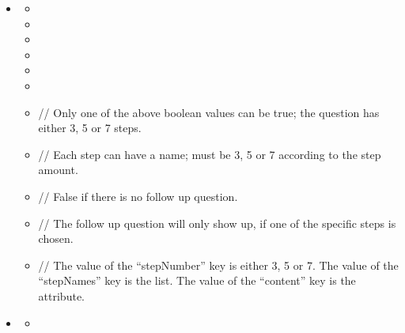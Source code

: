 \documentclass[a4paper]{scrreprt}
\begin{document}
{\begin{itemize}
                    \item {}
                        \begin{itemize}
                            \item {}
                            \item {}
                            \item {}
                            \item {}
                            \item {}
                            \item {}
                            \item {}
                                \par // Only one of the above boolean values can be true; the question has either 3, 5 or 7 steps.
                            \item {}
                                \par // Each step can have a name;  must be 3, 5 or 7 according to the step amount.
                            \item {}
                                \par // False if there is no follow up question.
                            \item {}
                                \par // The follow up question will only show up, if one of the specific steps is chosen.
                            \item {}
                               \par // The value of the “stepNumber” key is either 3, 5 or 7. The value of the “stepNames” key is the  list. The value of the “content” key is the  attribute.
                        \end{itemize}

                    \item {}
                        \begin{itemize}
                            \item {}
                        \end{itemize}


\end{itemize}}
\end{document}
